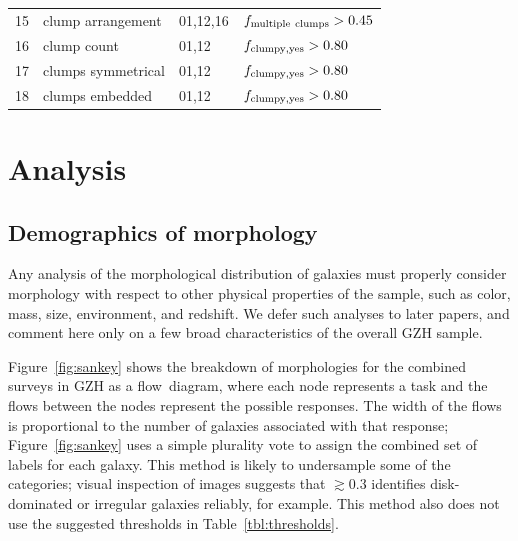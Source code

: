 \documentclass[twocolumn]{aastex6}
\begin{document}
\begin{table}
\begin{tabular}{llll}
15       & clump arrangement    & 01,12,16         & $f_{\rm multiple~clumps}>0.45$     \\
16       & clump count          & 01,12            & $f_{\rm clumpy,yes}>0.80$          \\
17       & clumps symmetrical   & 01,12            & $f_{\rm clumpy,yes}>0.80$          \\
18       & clumps embedded      & 01,12            & $f_{\rm clumpy,yes}>0.80$          \\
\hline\hline
\end{tabular}
\end{table}

\section{Analysis}\label{sec:analysis}


\subsection{Demographics of morphology}

Any analysis of the morphological distribution of galaxies must properly
consider morphology with respect to other physical properties of the sample,
such as color, mass, size, environment, and redshift. We defer such analyses to
later papers, and comment here only on a few broad characteristics of the
overall GZH sample. 

Figure~\ref{fig:sankey} shows the breakdown of morphologies for the combined
surveys in GZH as a flow~diagram, where each node represents a task and the
flows between the nodes represent the possible responses. The width of the
flows is proportional to the number of galaxies associated with that response;
Figure~\ref{fig:sankey} uses a simple plurality vote to assign the combined set
of labels for each galaxy. This method is likely to undersample some of the
categories; visual inspection of images suggests that \ffeatures$\gtrsim0.3$
identifies disk-dominated or irregular galaxies reliably, for example. This
method also does not use the suggested thresholds in
Table~\ref{tbl:thresholds}. 
\end{document}
